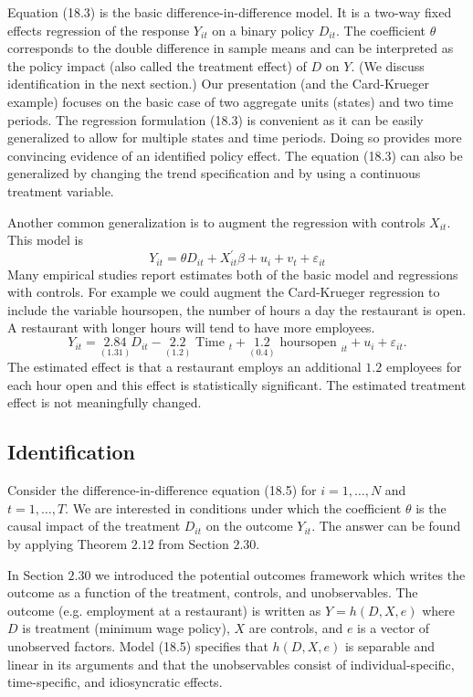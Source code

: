 \documentclass[10pt]{article}
\begin{document}
Equation (18.3) is the basic difference-in-difference model. It is a two-way fixed effects regression of the response $Y_{i t}$ on a binary policy $D_{i t}$. The coefficient $\theta$ corresponds to the double difference in sample means and can be interpreted as the policy impact (also called the treatment effect) of $D$ on $Y$. (We discuss identification in the next section.) Our presentation (and the Card-Krueger example) focuses on the basic case of two aggregate units (states) and two time periods. The regression formulation (18.3) is convenient as it can be easily generalized to allow for multiple states and time periods. Doing so provides more convincing evidence of an identified policy effect. The equation (18.3) can also be generalized by changing the trend specification and by using a continuous treatment variable.

Another common generalization is to augment the regression with controls $X_{i t}$. This model is
$$
Y_{i t}=\theta D_{i t}+X_{i t}^{\prime} \beta+u_{i}+v_{t}+\varepsilon_{i t}
$$
Many empirical studies report estimates both of the basic model and regressions with controls. For example we could augment the Card-Krueger regression to include the variable hoursopen, the number of hours a day the restaurant is open. A restaurant with longer hours will tend to have more employees.
$$
Y_{i t}=\underset{(1.31)}{2.84} D_{i t}-\underset{(1.2)}{2.2} \text { Time }_{t}+\underset{(0.4)}{1.2} \text { hoursopen }_{i t}+u_{i}+\varepsilon_{i t} .
$$
The estimated effect is that a restaurant employs an additional $1.2$ employees for each hour open and this effect is statistically significant. The estimated treatment effect is not meaningfully changed.

\subsection{Identification}
Consider the difference-in-difference equation (18.5) for $i=1, \ldots, N$ and $t=1, \ldots, T$. We are interested in conditions under which the coefficient $\theta$ is the causal impact of the treatment $D_{i t}$ on the outcome $Y_{i t}$. The answer can be found by applying Theorem $2.12$ from Section $2.30$.

In Section $2.30$ we introduced the potential outcomes framework which writes the outcome as a function of the treatment, controls, and unobservables. The outcome (e.g. employment at a restaurant) is written as $Y=h(D, X, e)$ where $D$ is treatment (minimum wage policy), $X$ are controls, and $e$ is a vector of unobserved factors. Model (18.5) specifies that $h(D, X, e)$ is separable and linear in its arguments and that the unobservables consist of individual-specific, time-specific, and idiosyncratic effects.
\end{document}
